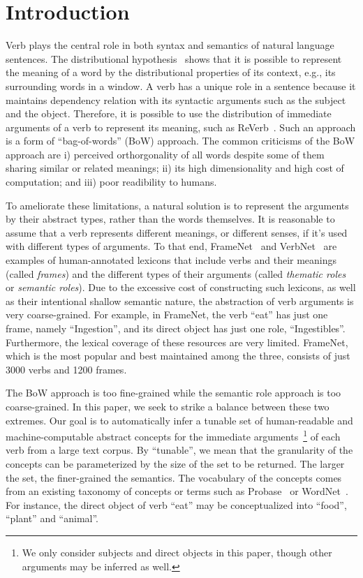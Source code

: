 \section{Introduction}
Verb plays the central role in both syntax and semantics of natural language sentences.
The distributional hypothesis~\cite{harris1954distributional,miller1991contextual}
shows that it is possible to represent the meaning of a word by the distributional
properties of its context, e.g., its surrounding words in a window.
A verb has a unique role in a sentence because it maintains dependency relation
with its syntactic arguments such as the subject and the object.
Therefore, it is possible to use the
distribution of immediate arguments of a verb
to represent its meaning, such as ReVerb~\cite{fader2011identifying}.
Such an approach is a form of
``bag-of-words'' (BoW) approach. The common criticisms of the BoW approach
are i) perceived orthorgonality of all words despite some of them sharing
similar or related meanings; ii) its high dimensionality and high
cost of computation; and
iii) poor readibility to humans.

To ameliorate these limitations, a natural solution is to represent the
arguments by their abstract types, rather than the words themselves.
It is reasonable to assume that a verb represents different meanings,
or different senses, if it's used with different types of arguments.
To that end, FrameNet~\cite{baker1998berkeley} and VerbNet~\cite{kipper2000class}
are examples of human-annotated lexicons that include verbs and their
meanings (called {\em frames}) and the different types of
their arguments (called {\em thematic roles} or {\em semantic roles}).
Due to the excessive cost of constructing such
lexicons, as well as their intentional shallow semantic nature,
the abstraction of verb arguments is very coarse-grained. For example,
in FrameNet, the verb ``eat'' has just one frame, namely ``Ingestion'',
and its direct object has just one role, ``Ingestibles''.
Furthermore, the lexical coverage of these
resources are very limited. FrameNet, which is the most popular and best
maintained among the three, consists of just 3000 verbs and 1200
frames.

The BoW approach is too fine-grained while the semantic role approach
is too coarse-grained.
In this paper, we seek to strike a balance between these two
extremes. Our goal is to automatically infer a tunable set of
human-readable and machine-computable abstract concepts for
the immediate arguments~\footnote{We only consider subjects and
direct objects in this paper, though other arguments may be inferred
as well.} of each verb from a large text corpus.
By ``tunable'', we mean that the granularity of
the concepts can be parameterized by the size of the set to be returned.
The larger the set, the finer-grained the semantics.
The vocabulary of the concepts
comes from an existing taxonomy of concepts or terms such as
Probase~\cite{wu2012probase}  or WordNet~\cite{miller1998wordnet}.
For instance, the direct object of verb ``eat'' may be conceptualized
into ``food'', ``plant'' and ``animal''.

